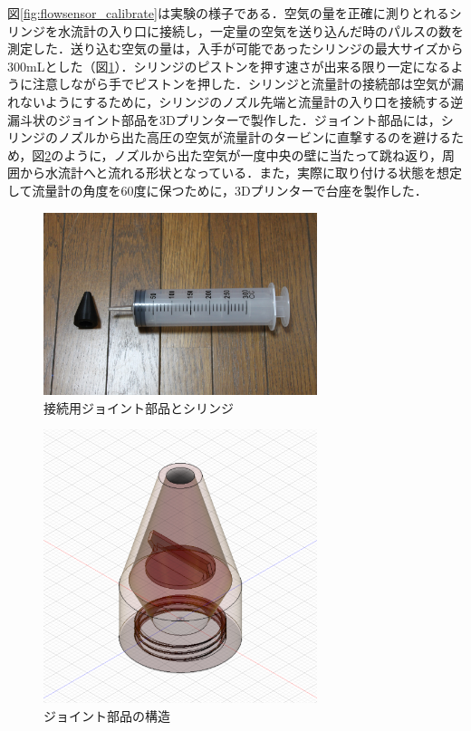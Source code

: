 図\ref{fig:flowsensor_calibrate}は実験の様子である．空気の量を正確に測りとれるシリンジを水流計の入り口に接続し，一定量の空気を送り込んだ時のパルスの数を測定した．送り込む空気の量は，入手が可能であったシリンジの最大サイズから300mLとした（図\ref{fig:syringe}）．シリンジのピストンを押す速さが出来る限り一定になるように注意しながら手でピストンを押した．シリンジと流量計の接続部は空気が漏れないようにするために，シリンジのノズル先端と流量計の入り口を接続する逆漏斗状のジョイント部品を3Dプリンターで製作した．ジョイント部品には，シリンジのノズルから出た高圧の空気が流量計のタービンに直撃するのを避けるため，図\ref{fig:syringe_cone}のように，ノズルから出た空気が一度中央の壁に当たって跳ね返り，周囲から水流計へと流れる形状となっている．また，実際に取り付ける状態を想定して流量計の角度を60度に保つために，3Dプリンターで台座を製作した．

\begin{figure}[H]
  \begin{center}
    \includegraphics[width=8cm]{fig/syringe}
    \caption{接続用ジョイント部品とシリンジ}
    \label{fig:syringe}
  \end{center}
\end{figure}

\begin{figure}[H]
  \begin{center}
    \includegraphics[width=8cm]{fig/syringe_cone}
    \caption{ジョイント部品の構造}
    \label{fig:syringe_cone}
  \end{center}
\end{figure}

